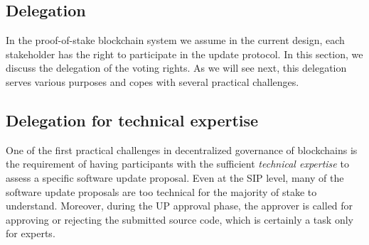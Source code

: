 \documentclass[11pt,a4paper]{article}
\begin{document}

\subsection{Delegation}
\label{sec:delegation}

In the proof-of-stake blockchain system we assume in the current design, each
stakeholder has the right to participate in the update protocol.
%
In this section, we discuss the delegation of the voting rights. As we will see
next, this delegation serves various purposes and copes with several practical
challenges.

\subsection{Delegation for technical expertise}
\label{sec:deleg-techn-expert}

One of the first practical challenges in decentralized governance of blockchains
is the requirement of having participants with the sufficient \emph{technical
  expertise} to assess a specific software update proposal.
%
Even at the SIP level, many of the software update proposals are too technical
for the majority of stake to understand.
%
Moreover, during the UP approval phase, the approver is called for approving or
rejecting the submitted source code, which is certainly a task only for experts.
\end{document}
